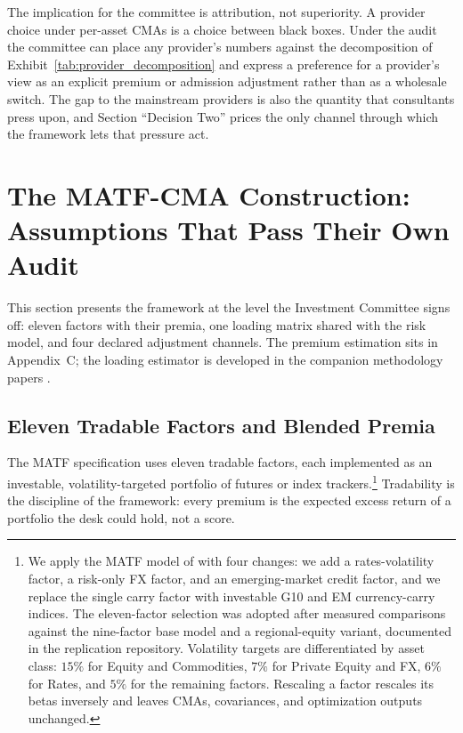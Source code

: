 \documentclass[pdftex,12pt,a4paper]{article}
\begin{document}
The implication for the committee is attribution, not superiority. A provider choice under per-asset CMAs is a choice between black boxes. Under the audit the committee can place any provider's numbers against the decomposition of Exhibit~\ref{tab:provider_decomposition} and express a preference for a provider's view as an explicit premium or admission adjustment rather than as a wholesale switch. The gap to the mainstream providers is also the quantity that consultants press upon, and Section ``Decision Two'' prices the only channel through which the framework lets that pressure act.


\sectionfont{\MakeUppercase}
\section*{The MATF-CMA Construction: Assumptions That Pass Their Own Audit}\label{sec:framework}

This section presents the framework at the level the Investment Committee signs off: eleven factors with their premia, one loading matrix shared with the risk model, and four declared adjustment channels. The premium estimation sits in Appendix~C; the loading estimator is developed in the companion methodology papers \citep{SeppFactorLassoCSDA2026,SeppFactorLassoJSS2026}.

\subsection*{Eleven Tradable Factors and Blended Premia}\label{subsec:factors}

The MATF specification uses eleven tradable factors, each implemented as an investable, volatility-targeted portfolio of futures or index trackers.\footnote{%
We apply the MATF model of \cite{Rosaa2026} with four changes: we add a rates-volatility factor, a risk-only FX factor, and an emerging-market credit factor, and we replace the single carry factor with investable G10 and EM currency-carry indices. The eleven-factor selection was adopted after measured comparisons against the nine-factor base model and a regional-equity variant, documented in the replication repository. Volatility targets are differentiated by asset class: $15\%$ for Equity and Commodities, $7\%$ for Private Equity and FX, $6\%$ for Rates, and $5\%$ for the remaining factors. Rescaling a factor rescales its betas inversely and leaves CMAs, covariances, and optimization outputs unchanged.} Tradability is the discipline of the framework: every premium is the expected excess return of a portfolio the desk could hold, not a score.
\end{document}
